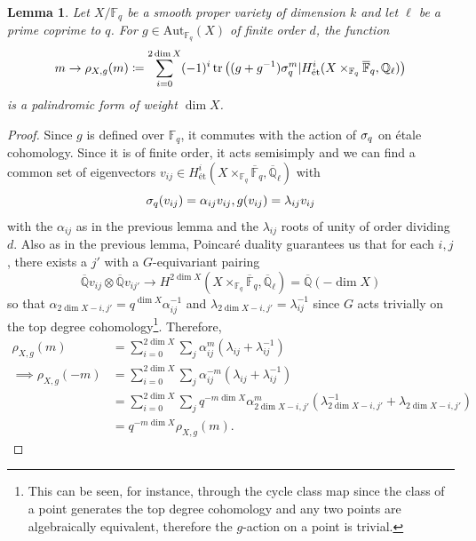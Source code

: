 \documentclass[10pt]{article}
\theoremstyle{plain}
\newtheorem{lemma}[theorem]{Lemma}
\theoremstyle{definition}
\numberwithin{equation}{section}
\begin{document}
\begin{lemma}\label{lemma: twisted point counts have the right weight}
Let $X/\mathbb F_q$ be a smooth proper variety of dimension $k$ and let $\ell$ be a prime coprime to $q$. For $g \in \mathrm{Aut}_{\mathbb F_q}(X)$ of finite order $d$, the function
\[m \to \rho_{X,g}(m) \coloneqq \sum_{i=0}^{2\dim X}(-1)^i\operatorname{tr}\left((g+g^{-1})\sigma_q^m|H^i_{\text{\'et}}(X\times_{\mathbb F_q}\overline{\mathbb F}_q,\mathbb Q_\ell)\right)\]
is a palindromic form of weight $\dim X$.
\end{lemma}
\begin{proof}
Since $g$ is defined over $\mathbb F_q$, it commutes with the action of $\sigma_q$ on \'etale cohomology. Since it is of finite order, it acts semisimply and we can find a common set of eigenvectors $v_{ij} \in H^i_{\text{\'et}}(X\times_{\mathbb F_q}\overline{\mathbb F}_q,\overline{\mathbb Q}_\ell)$ with
\[\sigma_q(v_{ij}) = \alpha_{ij}v_{ij}, g(v_{ij}) = \lambda_{ij}v_{ij}\]
with the $\alpha_{ij}$ as in the previous lemma and the $\lambda_{ij}$ roots of unity of order dividing $d$. Also as in the previous lemma, Poincar\'e duality guarantees us that for each $i,j$, there exists a $j'$ with a $G$-equivariant pairing
\[\overline{\mathbb Q}v_{ij} \otimes \overline{\mathbb Q} v_{ij'} \to H^{2\dim X}(X\times_{\mathbb F_q}\overline{\mathbb F}_q,\overline{\mathbb Q}_\ell) = \overline{\mathbb Q}(-\dim X)\]
so that $\alpha_{2\dim X-i,j'} = q^{\dim X}\alpha_{ij}^{-1}$ and $\lambda_{2\dim X-i,j'} = \lambda_{ij}^{-1}$ since $G$ acts trivially on the top degree cohomology\footnote{This can be seen, for instance, through the cycle class map since the class of a point generates the top degree cohomology and any two points are algebraically equivalent, therefore the $g$-action on a point is trivial.}. Therefore,
\begin{align*}
    \rho_{X,g}(m) &= \sum_{i=0}^{2\dim X}\sum_{j}\alpha_{ij}^m\left(\lambda_{ij} + \lambda_{ij}^{-1}\right)\\
    \implies \rho_{X,g}(-m) &= \sum_{i=0}^{2\dim X}\sum_{j}\alpha_{ij}^{-m}\left(\lambda_{ij} + \lambda_{ij}^{-1}\right)\\
    &=\sum_{i=0}^{2\dim X}\sum_{j}q^{-m\dim X}\alpha_{2\dim X-i,j'}^{m}\left(\lambda_{2\dim X-i,j'}^{-1}+\lambda_{2\dim X-i,j'}\right)\\ &= q^{-m\dim X}\rho_{X, g}(m).
\end{align*}
\end{proof}
\end{document}
